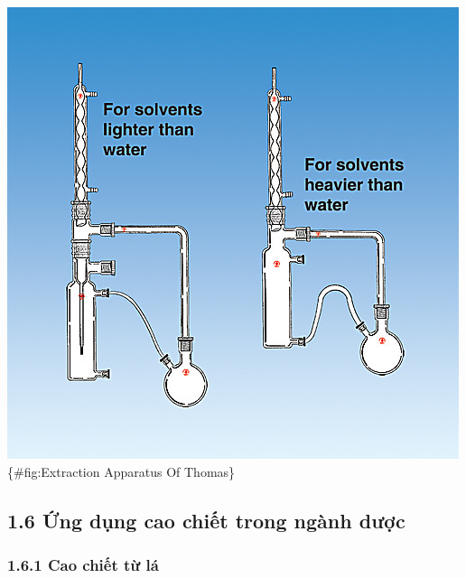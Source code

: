 \documentclass[
  letterpaper,
  DIV=11,
  numbers=noendperiod]{scrartcl}
\begin{document}
\includegraphics{../graphics/Extraction Apparatus Of Thomas.jpg}\{\#fig:Extraction
Apparatus Of Thomas\}

\subsection{1.6 Ứng dụng cao chiết trong ngành
dược}\label{ux1ee9ng-dux1ee5ng-cao-chiux1ebft-trong-nguxe0nh-dux1b0ux1ee3c}

\subsubsection{1.6.1 Cao chiết từ
lá}\label{cao-chiux1ebft-tux1eeb-luxe1}
\end{document}

